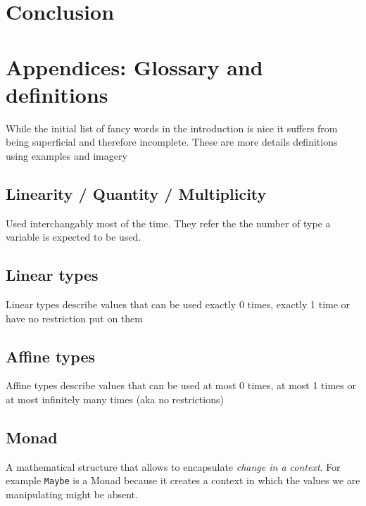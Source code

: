 \documentclass[
]{article}
\begin{document}
\hypertarget{conclusion}{%
\section{Conclusion}\label{conclusion}}

\hypertarget{appendices-glossary-and-definitions}{%
\section{Appendices: Glossary and
definitions}\label{appendices-glossary-and-definitions}}

While the initial list of fancy words in the introduction is nice it
suffers from being superficial and therefore incomplete. These are more
details definitions using examples and imagery

\hypertarget{linearity-quantity-multiplicity-1}{%
\subsection{Linearity / Quantity /
Multiplicity}\label{linearity-quantity-multiplicity-1}}

Used interchangably most of the time. They refer the the number of type
a variable is expected to be used.

\hypertarget{linear-types-1}{%
\subsection{Linear types}\label{linear-types-1}}

Linear types describe values that can be used exactly 0 times, exactly 1
time or have no restriction put on them

\hypertarget{affine-types}{%
\subsection{Affine types}\label{affine-types}}

Affine types describe values that can be used at most 0 times, at most 1
times or at most infinitely many times (aka no restrictions)

\hypertarget{monad}{%
\subsection{Monad}\label{monad}}

A mathematical structure that allows to encapsulate \emph{change in a
context}. For example \texttt{Maybe} is a Monad because it creates a
context in which the values we are manipulating might be absent.
\end{document}
